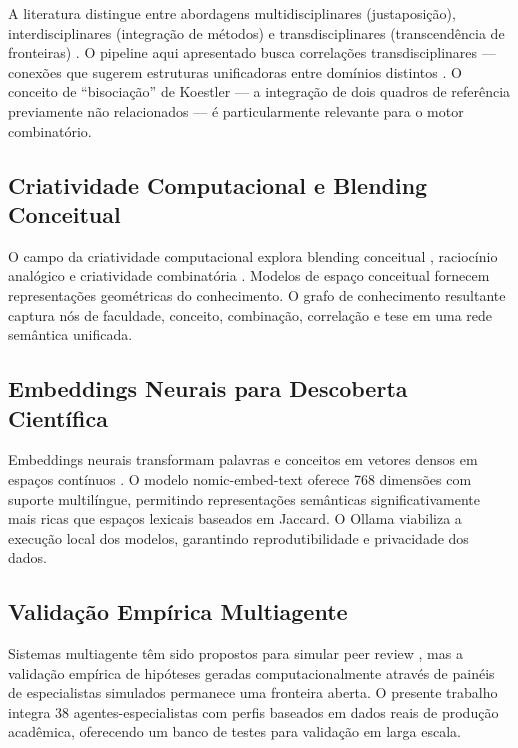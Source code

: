 \documentclass[a4paper,12pt]{article}
\begin{document}
A literatura distingue entre abordagens multidisciplinares (justaposição), interdisciplinares 
(integração de métodos) e transdisciplinares (transcendência de fronteiras) 
\cite{klein1990, nicolescu1996, bernstein2015}. O pipeline aqui apresentado busca correlações 
transdisciplinares --- conexões que sugerem estruturas unificadoras entre domínios distintos 
\cite{morin2000, piaget1972}. O conceito de ``bisociação'' de Koestler \cite{koestler1964} --- 
a integração de dois quadros de referência previamente não relacionados --- é particularmente 
relevante para o motor combinatório.

\subsection{Criatividade Computacional e Blending Conceitual}

O campo da criatividade computacional explora blending conceitual \cite{fauconnier2002, veale2012}, 
raciocínio analógico \cite{hofstadter1995, gentner1983} e criatividade combinatória 
\cite{boden2004}. Modelos de espaço conceitual \cite{gardenfors2000, gardenfors2014} fornecem 
representações geométricas do conhecimento. O grafo de conhecimento resultante 
\cite{ehrlinger2016, paulheim2017} captura nós de faculdade, conceito, combinação, correlação 
e tese em uma rede semântica unificada.

\subsection{Embeddings Neurais para Descoberta Científica}

Embeddings neurais transformam palavras e conceitos em vetores densos em espaços contínuos 
\cite{mikolov2013, pennington2014, devlin2019}. O modelo nomic-embed-text \cite{nomic2024} 
oferece 768 dimensões com suporte multilíngue, permitindo representações semânticas 
significativamente mais ricas que espaços lexicais baseados em Jaccard. O Ollama 
\cite{ollama2024} viabiliza a execução local dos modelos, garantindo reprodutibilidade 
e privacidade dos dados.

\subsection{Validação Empírica Multiagente}

Sistemas multiagente têm sido propostos para simular peer review \cite{shah2022, zhang2024}, 
mas a validação empírica de hipóteses geradas computacionalmente através de painéis de 
especialistas simulados permanece uma fronteira aberta. O presente trabalho integra 38 
agentes-especialistas com perfis baseados em dados reais de produção acadêmica, oferecendo 
um banco de testes para validação em larga escala.
\end{document}

